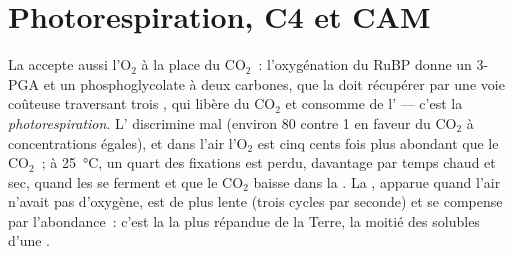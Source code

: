 \section{Photorespiration, C4 et CAM}

\begin{proposition}\label{prop:b1:photosynthesis:photorespiration}
La  accepte aussi l'$\mathrm{O_2}$ à la place du
$\mathrm{CO_2}$~: l'oxygénation du RuBP donne un 3-PGA et un
phosphoglycolate à deux carbones, que la  doit récupérer par une
voie coûteuse traversant trois , qui libère du $\mathrm{CO_2}$
et consomme de l' --- c'est la \emph{photorespiration}. L'
discrimine mal (environ \qty{80}{} contre 1 en faveur du
$\mathrm{CO_2}$ à concentrations égales), et dans l'air
l'$\mathrm{O_2}$ est cinq cents fois plus abondant que le
$\mathrm{CO_2}$~; à \qty{25}{\celsius}, un quart des fixations est
perdu, davantage par temps chaud et sec, quand les  se ferment
et que le $\mathrm{CO_2}$ baisse dans la . La , apparue
quand l'air n'avait pas d'oxygène, est de plus lente (trois cycles par
seconde) et se compense par l'abondance~: c'est la  la plus
répandue de la Terre, la moitié des  solubles d'une .
\end{proposition}

